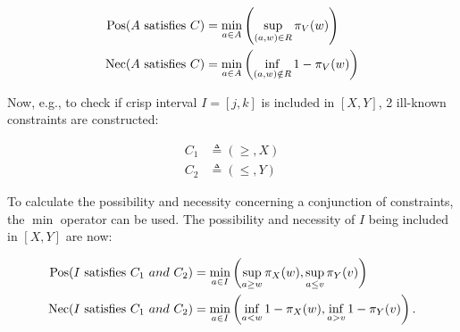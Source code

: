 \begin{align}
\operatorname{Pos}(A\text{ satisfies }C) & = \min_{a \in A}\left(\sup_{(a,w) \in R}\pi_{V}(w)\right) \label{ill-known-pos}\\
\operatorname{Nec}(A\text{ satisfies }C) & = \min_{a \in A}\left(\inf_{(a,w) \notin R} 1-\pi_{V}(w)\right) \label{ill-known-nec}
\end{align}

Now, e.g., to check if crisp interval $I = \left[j, k\right]$ is included in $\left[X, Y\right]$, 2 ill-known constraints are constructed:


\vspace{-10pt}

\begin{eqnarray}
C_1 & \triangleq\left(\geq,X\right)\\
C_2 & \triangleq\left(\leq,Y\right)
\end{eqnarray}

To calculate the possibility and necessity concerning a conjunction of constraints, the $\min$ operator can be used. The possibility and necessity of $I$ being included in $\left[X, Y\right]$ are now: %

\vspace{-10pt}

\begin{align}
\label{eq:interval-pos}
\operatorname{Pos}(I\text{ satisfies }C_1\ and\ C_2) & = \min_{a \in I}\left(\sup_{a \geq w}\pi_{X}(w),\sup_{a \leq v}\pi_{Y}(v)\right)\\
\label{eq:interval-nec}
\operatorname{Nec}(I\text{ satisfies }C_1\ and\ C_2) & = \min_{a \in I}\left(\inf_{a < w} 1-\pi_{X}(w),\inf_{a > v} 1-\pi_{Y}(v)\right).
\end{align}


